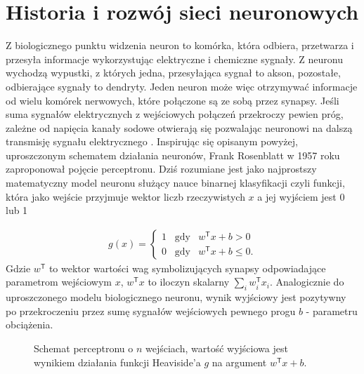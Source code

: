 \documentclass[11pt]{book}
\theoremstyle{definition}
\begin{document}
\section{Historia i rozwój sieci neuronowych}

Z biologicznego punktu widzenia neuron to komórka, która odbiera, przetwarza i przesyła informacje wykorzystując elektryczne i chemiczne sygnały. Z neuronu wychodzą wypustki, z których jedna, przesyłająca sygnał to akson, pozostałe, odbierające sygnały to dendryty.  Jeden neuron może więc otrzymywać informacje od wielu komórek nerwowych, które połączone są ze sobą przez synapsy. Jeśli suma sygnałów elektrycznych z wejściowych połączeń przekroczy pewien próg, zależne od napięcia kanały sodowe otwierają się pozwalając neuronowi na dalszą transmisję sygnału elektrycznego \cite{NeuronyDelta}. Inspirując się opisanym powyżej, uproszczonym schematem działania neuronów, Frank Rosenblatt w 1957 roku zaproponował pojęcie perceptronu. Dziś rozumiane jest jako najprostszy matematyczny model neuronu służący nauce binarnej klasyfikacji czyli funkcji, która jako wejście przyjmuje wektor liczb rzeczywistych $x$ a jej wyjściem jest 0 lub 1

\begin{eqnarray*}
	g(x) = \begin{cases} 1 \;\;\;\text{gdy} & w^\mathsf{T}x + b > 0 \\ 0 \;\;\;\text{gdy} &w^\mathsf{T}x + b \leq 0.  \end{cases}
\end{eqnarray*}
Gdzie $w^\mathsf{T}$ to wektor wartości wag symbolizujących synapsy odpowiadające parametrom wejściowym $x$, $w^\mathsf{T} x$ to iloczyn skalarny $\sum_{i}w^\mathsf{T}_i x_i$. Analogicznie do uproszczonego modelu biologicznego neuronu, wynik wyjściowy jest pozytywny po przekroczeniu przez sumę sygnałów wejściowych pewnego progu $b$ - parametru obciążenia. 

\begin{SCfigure}
	\centering
	\caption{Schemat perceptronu o $n$ wejściach, wartość wyjściowa jest wynikiem działania funkcji Heaviside'a $g$ na argument $w^\mathsf{T}x + b$.}
\end{SCfigure}
%
\end{document}
